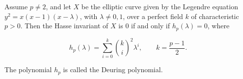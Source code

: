 Assume $p \neq 2$, and let $X$ be the elliptic curve given by the Legendre equation $y^2 = x(x-1)(x-\lambda)$, with $\lambda \neq 0, 1$, over a perfect field $k$ of characteristic $p > 0$. Then the Hasse invariant of $X$ is $0$ if and only if $h_p(\lambda) = 0$, where

$$h_p(\lambda) = \sum_{i=0}^{k} \binom{k}{i}^2 \lambda^i, \qquad k = \frac{p-1}{2}.$$

The polynomial $h_p$ is called the Deuring polynomial.
